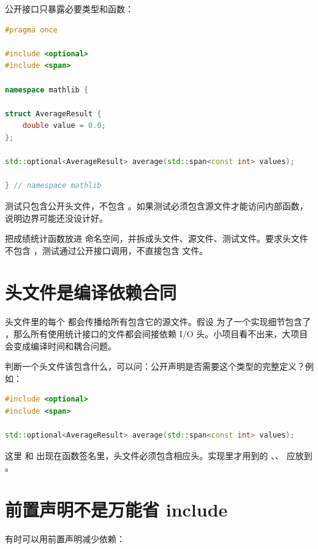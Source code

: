 公开接口只暴露必要类型和函数：

\begin{lstlisting}[language=C++,caption={statistics.hpp}]
#pragma once

#include <optional>
#include <span>

namespace mathlib {

struct AverageResult {
    double value = 0.0;
};

std::optional<AverageResult> average(std::span<const int> values);

} // namespace mathlib
\end{lstlisting}

测试只包含公开头文件，不包含 。如果测试必须包含源文件才能访问内部函数，说明边界可能还没设计好。

\begin{exercisebox}
把成绩统计函数放进  命名空间，并拆成头文件、源文件、测试文件。要求头文件不包含 ，测试通过公开接口调用，不直接包含  文件。
\end{exercisebox}

\section{头文件是编译依赖合同}

头文件里的每个  都会传播给所有包含它的源文件。假设  为了一个实现细节包含了 ，那么所有使用统计接口的文件都会间接依赖 I/O 头。小项目看不出来，大项目会变成编译时间和耦合问题。

判断一个头文件该包含什么，可以问：公开声明是否需要这个类型的完整定义？例如：

\begin{lstlisting}[language=C++,caption={公开接口需要 span 和 optional}]
#include <optional>
#include <span>

std::optional<AverageResult> average(std::span<const int> values);
\end{lstlisting}

这里  和  出现在函数签名里，头文件必须包含相应头。实现里才用到的 、、 应放到 。

\section{前置声明不是万能省 include}

有时可以用前置声明减少依赖：

